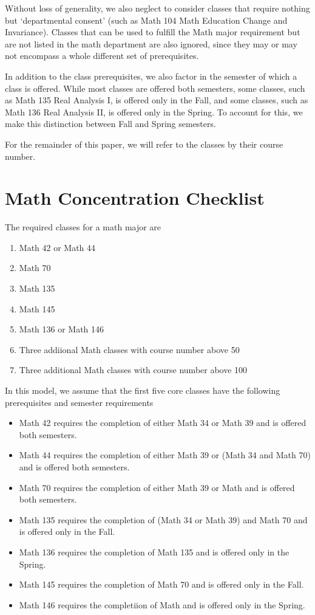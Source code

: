 \documentclass[12pt, oneside]{article}
\begin{document}
\bigskip

Without loss of generality, we also neglect to consider classes that require nothing but `departmental consent' (such as Math 104 Math Education Change and Invariance). Classes that can be used to fulfill the Math major requirement but are not listed in the math department are also ignored, since they may or may not encompass a whole different set of prerequisites. 

\bigskip

In addition to the class prerequisites, we also factor in the semester of which a class is offered. While most classes are offered both semesters, some classes, such as Math 135 Real Analysis I, is offered only in the Fall, and some classes, such as Math 136 Real Analysis II, is offered only in the Spring. To account for this, we make this distinction between Fall and Spring semesters.

\bigskip
For the remainder of this paper, we will refer to the classes by their course number.

\section{Math Concentration Checklist}
The required classes for a math major are 
    \begin{enumerate}
        \item Math 42 or Math 44
        \item Math 70
        \item Math 135
        \item Math 145
        \item Math 136 or Math 146
        \item Three addiional Math classes with course number above 50
        \item Three additional Math classes with course number above 100
    \end{enumerate}
In this model, we assume that the first five core classes have the following prerequisites and semester requirements
    \begin{itemize}
        \item Math 42 requires the completion of either Math 34 or Math 39 and is offered both semesters.
        \item Math 44 requires the completion of either Math 39 or (Math 34 and Math 70) and is offered both semesters.
        \item Math 70 requires the completion of either Math 39 or Math and is offered both semesters.
        \item Math 135 requires the completion of (Math 34 or Math 39) and Math 70 and is offered only in the Fall.
        \item Math 136 requires the completion of Math 135 and is offered only in the Spring.
        \item Math 145 requires the completion of Math 70 and is offered only in the Fall.
        \item Math 146 requires the completiion of Math and is offered only in the Spring.


    \end{itemize}
\end{document}
